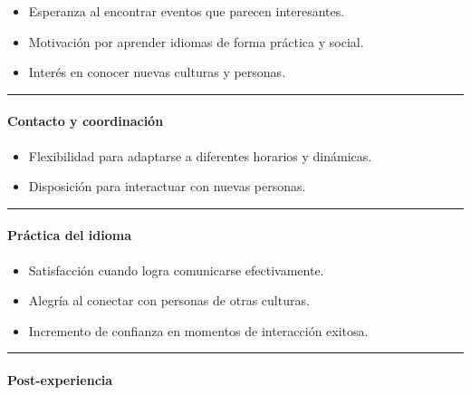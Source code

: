 \begin{itemize}
\tightlist
\item
  Esperanza al encontrar eventos que parecen interesantes.
\item
  Motivación por aprender idiomas de forma práctica y social.
\item
  Interés en conocer nuevas culturas y personas.
\end{itemize}

\begin{center}\rule{0.5\linewidth}{0.5pt}\end{center}

\paragraph{Contacto y
coordinación}\label{report__20-cap2-requirements-analysis.md__contacto-y-coordinaciuxf3n-1}

\begin{itemize}
\tightlist
\item
  Flexibilidad para adaptarse a diferentes horarios y dinámicas.
\item
  Disposición para interactuar con nuevas personas.
\end{itemize}

\begin{center}\rule{0.5\linewidth}{0.5pt}\end{center}

\paragraph{Práctica del
idioma}\label{report__20-cap2-requirements-analysis.md__pruxe1ctica-del-idioma-1}

\begin{itemize}
\tightlist
\item
  Satisfacción cuando logra comunicarse efectivamente.
\item
  Alegría al conectar con personas de otras culturas.
\item
  Incremento de confianza en momentos de interacción exitosa.
\end{itemize}

\begin{center}\rule{0.5\linewidth}{0.5pt}\end{center}

\paragraph{Post-experiencia}\label{report__20-cap2-requirements-analysis.md__post-experiencia-1}

